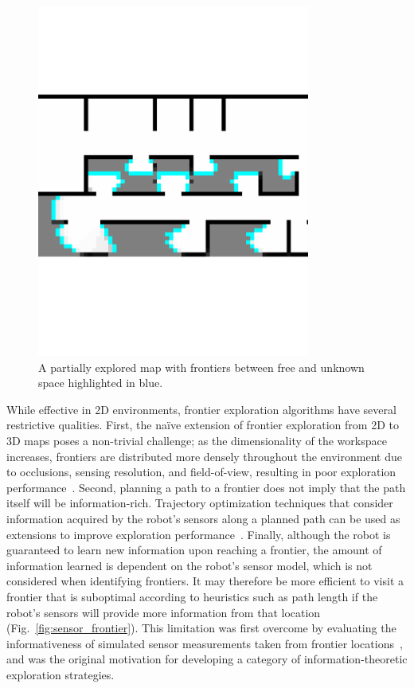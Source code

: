 \begin{figure}[t]
  \centering
  \includegraphics[trim=0cm 0.4cm 0.1cm 0.1cm, clip, width=0.8\textwidth]{frontiers.pdf}
  \caption{A partially explored map with frontiers between free and unknown
  space highlighted in blue.\label{fig:frontiers}}
\end{figure}

While effective in 2D environments, frontier exploration algorithms have
several restrictive qualities. First, the na\"{i}ve extension of frontier exploration
from 2D to 3D maps poses a non-trivial challenge; as the
dimensionality of the workspace increases, frontiers are distributed more
densely throughout the environment due to occlusions, sensing resolution, and
field-of-view, resulting in poor exploration performance~\cite{shen20113d}.
Second, planning a path to a frontier does not imply that the path
itself will be information-rich. Trajectory optimization techniques that
consider information acquired by the robot's sensors along a planned path can be used
as extensions to improve exploration performance~\cite{sim2004online,kollar2008trajectory}.
Finally, although the robot is guaranteed to learn new information upon reaching a
frontier, the amount of information learned is dependent on the
robot's sensor model, which is not considered when identifying frontiers.
It may therefore be more efficient to visit a frontier that is
suboptimal according to heuristics such as path length if the robot's sensors
will provide more information from that location
(Fig.~\ref{fig:sensor_frontier}).
This limitation was first overcome by evaluating the informativeness of simulated
sensor measurements taken from frontier locations~\cite{gonzalez2002navigation}, and was the
original motivation for developing a category of information-theoretic exploration strategies.

